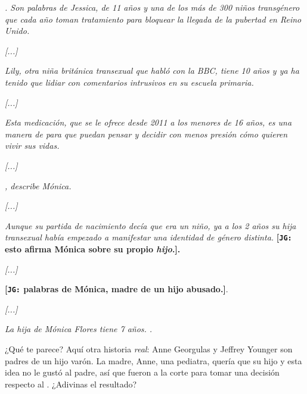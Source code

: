 \documentclass[12pt]{article}
\begin{document}
	\begin{displayquote}
	\textit{. Son palabras de Jessica, de 11 años y una de los más de 300
	niños transgénero que cada año toman tratamiento para
	bloquear la llegada de la pubertad en Reino Unido.}

	\textit{[...]}

	\textit{Lily, otra niña británica transexual que habló con la BBC, tiene
	10 años y ya ha tenido que lidiar con comentarios intrusivos en
	su escuela primaria.}

	\textit{[...]}

	\textit{Esta medicación, que se le ofrece desde 2011 a los menores de
	16 años, es una manera de  para que puedan
	pensar y decidir con menos presión cómo quieren vivir sus
	vidas.}

	\textit{[...]}

	\textit{, describe
	Mónica.}

	\textit{[...]}

	\textit{Aunque su partida de nacimiento decía que era un niño, ya a
	los 2 años su hija transexual había empezado a manifestar una
	identidad de género distinta.} \textbf{[\texttt{JG:} esto afirma Mónica
	sobre su propio \textit{hijo}.].}

	\textit{[...]}

	\textit{} \textbf{[\texttt{JG:} palabras de Mónica, madre de un hijo
	abusado.]}.

	\textit{[...]}

	\textit{La hija de Mónica Flores tiene 7 años. .}
	\end{displayquote}

	¿Qué te parece? Aquí otra historia \textit{real}: Anne Georgulas y
	Jeffrey Younger son padres de un hijo varón. La madre, Anne, una
	pediatra, quería que su hijo  y esta idea no
	le gustó al padre, así que fueron a la corte para tomar una decisión
	respecto al . ¿Adivinas el resultado?
\end{document}
